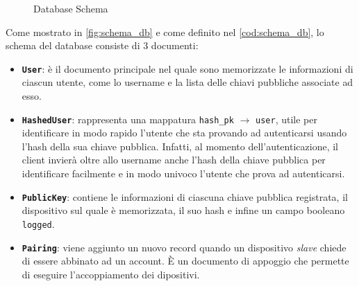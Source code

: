 \begin{figure}[!ht]
    \caption{Database Schema}
    \label{fig:schema_db}
\end{figure}

\hrulefill


Come mostrato in \autoref{fig:schema_db} e come definito nel \autoref{cod:schema_db}, lo schema del database consiste di 3 documenti:
\begin{itemize}
    \item \texttt{\textbf{User}}: è il documento principale nel quale sono memorizzate le informazioni di ciascun utente, come lo username e la lista delle chiavi pubbliche associate ad esso.
    \item \texttt{\textbf{HashedUser}}: rappresenta una mappatura \texttt{hash\_pk} $\rightarrow$ \texttt{user}, utile per identificare in modo rapido l'utente che sta provando ad autenticarsi usando l'hash della sua chiave pubblica. Infatti, al momento dell'autenticazione, il client invierà oltre allo username anche l'hash della chiave pubblica per identificare facilmente e in modo univoco l'utente che prova ad autenticarsi.
    \item \texttt{\textbf{PublicKey}}: contiene le informazioni di ciascuna chiave pubblica registrata, il dispositivo sul quale è memorizzata, il suo hash e infine un campo booleano \texttt{logged}.
    \item \texttt{\textbf{Pairing}}: viene aggiunto un nuovo record quando un dispositivo \textit{slave} chiede di essere abbinato ad un account. È un documento di appoggio che permette di eseguire l'accoppiamento dei dipositivi.
\end{itemize}

